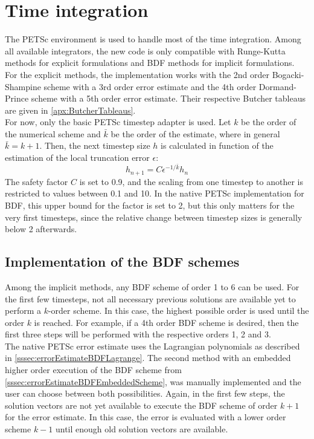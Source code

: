 \section{Time integration}
\label{sec:44mul4SEAS__TimeIntegration}
The PETSc environment is used to handle most of the time integration. Among all available integrators, the new code is only compatible with Runge-Kutta methods for explicit formulations and BDF methods for implicit formulations. \\
For the explicit methods, the implementation works with the 2nd order Bogacki-Shampine scheme with a 3rd order error estimate and the 4th order Dormand-Prince scheme with a 5th order error estimate. Their respective Butcher tableaus are given in \autoref{apx:ButcherTableaus}. \\
For now, only the basic PETSc timestep adapter is used. Let $k$ be the order of the numerical scheme and $\bar{k}$ be the order of the estimate, where in general $\bar{k}=k+1$. Then, the next timestep size $h$ is calculated in function of the estimation of the local truncation error $\epsilon$: 
\begin{equation}
	h_{n+1} = C\epsilon^{-1/\bar{k}}h_n
\end{equation}
The safety factor $C$ is set to 0.9, and the scaling from one timestep to another is restricted to values between 0.1 and 10. In the native PETSc implementation for BDF, this upper bound for the factor is set to 2, but this only matters for the very first timesteps, since the relative change between timestep sizes is generally below 2 afterwards.

\subsection{Implementation of the BDF schemes}
Among the implicit methods, any BDF scheme of order 1 to 6 can be used. For the first few timesteps, not all necessary previous solutions are available yet to perform a $k$-order scheme. In this case, the highest possible order is used until the order $k$ is reached. For example, if a 4th order BDF scheme is desired, then the first three steps will be performed with the respective orders 1, 2 and 3. \\
The native PETSc error estimate uses the Lagrangian polynomials as described in \autoref{sssec:errorEstimateBDFLagrange}. The second method with an embedded higher order execution of the BDF scheme from \autoref{sssec:errorEstimateBDFEmbeddedScheme}, was manually implemented and the user can choose between both possibilities. Again, in the first few steps, the solution vectors are not yet available to execute the BDF scheme of order $k+1$ for the error estimate. In this case, the error is evaluated with a lower order scheme $k-1$ until enough old solution vectors are available. \\

